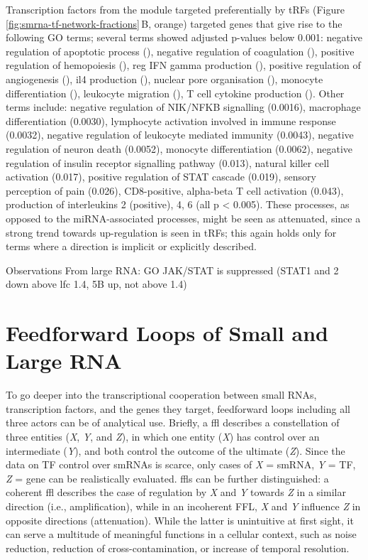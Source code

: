 Transcription factors from the module targeted preferentially by tRFs (Figure \ref{fig:smrna-tf-network-fractions}\,B, orange) targeted genes that give rise to the following GO terms; several terms showed adjusted p-values below 0.001: negative regulation of apoptotic process (), negative regulation of coagulation (), positive regulation of hemopoiesis (), reg IFN gamma production (), positive regulation of angiogenesis (), il4 production (), nuclear pore organisation (), monocyte differentiation (), leukocyte migration (), T cell cytokine production (). Other terms include: negative regulation of NIK/NFKB signalling (0.0016), macrophage differentiation (0.0030), lymphocyte activation involved in immune response (0.0032), negative regulation of leukocyte mediated immunity (0.0043), negative regulation of neuron death (0.0052), monocyte differentiation (0.0062), negative regulation of insulin receptor signalling pathway (0.013), natural killer cell activation (0.017), positive regulation of STAT cascade (0.019), sensory perception of pain (0.026), CD8-positive, alpha-beta T cell activation (0.043), production of interleukins 2 (positive), 4, 6 (all p < 0.005). These processes, as opposed to the miRNA-associated processes, might be seen as attenuated, since a strong trend towards up-regulation is seen in tRFs; this again holds only for terms where a direction is implicit or explicitly described.

Observations
From large RNA: GO JAK/STAT is suppressed (STAT1 and 2 down above lfc 1.4, 5B up, not above 1.4)

\section{Feedforward Loops of Small and Large RNA} \label{sec:stroke:ffl}
To go deeper into the transcriptional cooperation between small RNAs, transcription factors, and the genes they target, feedforward loops including all three actors can be of analytical use. Briefly, a \acf{ffl} describes a constellation of three entities (\emph{X}, \emph{Y}, and \emph{Z}), in which one entity (\emph{X}) has control over an intermediate (\emph{Y}), and both control the outcome of the ultimate (\emph{Z}).\cite{Reeves2019}  Since the data on TF control over smRNAs is scarce, only cases of \emph{X} = smRNA, \emph{Y} = TF, \emph{Z} = gene can be realistically evaluated. \Acp{ffl} can be further distinguished: a coherent \ac{ffl} describes the case of regulation by \emph{X} and \emph{Y} towards \emph{Z} in a similar direction (i.e., amplification), while in an incoherent FFL, \emph{X} and \emph{Y} influence \emph{Z} in opposite directions (attenuation). While the latter is unintuitive at first sight, it can serve a multitude of meaningful functions in a cellular context, such as noise reduction, reduction of cross-contamination, or increase of temporal resolution.\cite{Lai2016}

